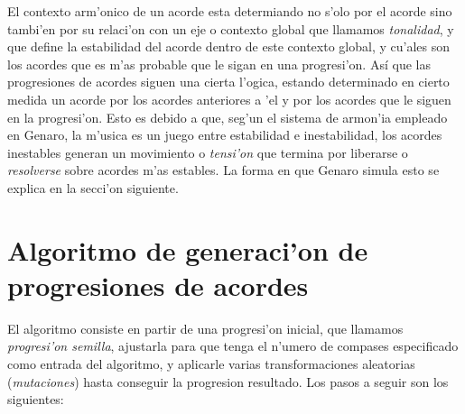 El contexto arm'onico de un acorde esta determiando no s'olo por el acorde sino tambi'en por su relaci'on con un eje o contexto global que llamamos \emph{tonalidad}, y que define la estabilidad del acorde dentro de este contexto global, y cu'ales son los acordes que es m'as probable que le sigan en una progresi'on. Así que las progresiones de acordes siguen una cierta l'ogica, estando determinado en cierto medida un acorde por los acordes anteriores a 'el y por los acordes que le siguen en la progresi'on. Esto es debido a que, seg'un el sistema de armon'ia empleado en Genaro, la m'usica es un juego entre estabilidad e inestabilidad, los acordes inestables generan un movimiento o \emph{tensi'on} que termina por liberarse o \emph{resolverse} sobre acordes m'as estables. La forma en que Genaro simula esto se explica en la secci'on siguiente.

\section {Algoritmo de generaci'on de progresiones de acordes}
El algoritmo consiste en partir de una progresi'on inicial, que llamamos \emph{progresi'on semilla}, ajustarla para que tenga el n'umero de compases especificado como entrada del algoritmo, y aplicarle varias transformaciones aleatorias (\emph{mutaciones}) hasta conseguir la progresion resultado. Los pasos a seguir son los siguientes:

